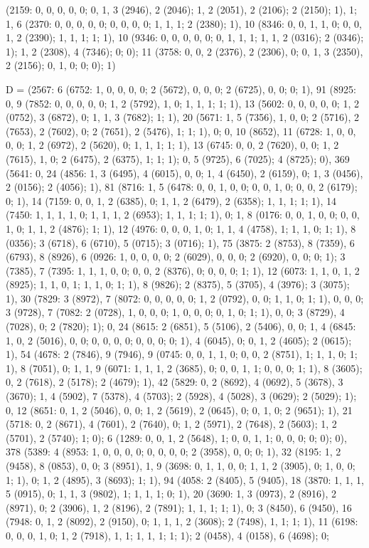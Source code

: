 {(2159: 0, 0, 0, 0, 0; 0, 1, 3 (2946), 2 (2046); 1, 2 (2051), 2 (2106); 2 (2150); 1), 1; 1, 6 (2370: 0, 0, 0, 0, 0; 0, 0, 0, 0; 1, 1, 1; 2 (2380); 1), 10 (8346: 0, 0, 1, 1, 0; 0, 0, 1, 2 (2390); 1, 1, 1; 1; 1), 10 (9346: 0, 0, 0, 0, 0; 0, 1, 1, 1; 1, 1, 2 (0316); 2 (0346); 1); 1, 2 (2308), 4 (7346); 0; 0); 11 (3758: 0, 0, 2 (2376), 2 (2306), 0; 0, 1, 3 (2350), 2 (2156); 0, 1, 0; 0; 0); 1)

D = (2567: 6 (6752: 1, 0, 0, 0, 0; 2 (5672), 0, 0, 0; 2 (6725), 0, 0; 0; 1), 91 (8925: 0, 9 (7852: 0, 0, 0, 0, 0; 1, 2 (5792), 1, 0; 1, 1, 1; 1; 1), 13 (5602: 0, 0, 0, 0, 0; 1, 2 (0752), 3 (6872), 0; 1, 1, 3 (7682); 1; 1), 20 (5671: 1, 5 (7356), 1, 0, 0; 2 (5716), 2 (7653), 2 (7602), 0; 2 (7651), 2 (5476), 1; 1; 1), 0; 0, 10 (8652), 11 (6728: 1, 0, 0, 0, 0; 1, 2 (6972), 2 (5620), 0; 1, 1, 1; 1; 1), 13 (6745: 0, 0, 2 (7620), 0, 0; 1, 2 (7615), 1, 0; 2 (6475), 2 (6375), 1; 1; 1); 0, 5 (9725), 6 (7025); 4 (8725); 0), 369 (5641: 0, 24 (4856: 1, 3 (6495), 4 (6015), 0, 0; 1, 4 (6450), 2 (6159), 0; 1, 3 (0456), 2 (0156); 2 (4056); 1), 81 (8716: 1, 5 (6478: 0, 0, 1, 0, 0; 0, 0, 1, 0; 0, 0, 2 (6179); 0; 1), 14 (7159: 0, 0, 1, 2 (6385), 0; 1, 1, 2 (6479), 2 (6358); 1, 1, 1; 1; 1), 14 (7450: 1, 1, 1, 1, 0; 1, 1, 1, 2 (6953); 1, 1, 1; 1; 1), 0; 1, 8 (0176: 0, 0, 1, 0, 0; 0, 0, 1, 0; 1, 1, 2 (4876); 1; 1), 12 (4976: 0, 0, 0, 1, 0; 1, 1, 4 (4758), 1; 1, 1, 0; 1; 1), 8 (0356); 3 (6718), 6 (6710), 5 (0715); 3 (0716); 1), 75 (3875: 2 (8753), 8 (7359), 6 (6793), 8 (8926), 6 (0926: 1, 0, 0, 0, 0; 2 (6029), 0, 0, 0; 2 (6920), 0, 0; 0; 1); 3 (7385), 7 (7395: 1, 1, 1, 0, 0; 0, 0, 2 (8376), 0; 0, 0, 0; 1; 1), 12 (6073: 1, 1, 0, 1, 2 (8925); 1, 1, 0, 1; 1, 1, 0; 1; 1), 8 (9826); 2 (8375), 5 (3705), 4 (3976); 3 (3075); 1), 30 (7829: 3 (8972), 7 (8072: 0, 0, 0, 0, 0; 1, 2 (0792), 0, 0; 1, 1, 0; 1; 1), 0, 0, 0; 3 (9728), 7 (7082: 2 (0728), 1, 0, 0, 0; 1, 0, 0, 0; 0, 1, 0; 1; 1), 0, 0; 3 (8729), 4 (7028), 0; 2 (7820); 1); 0, 24 (8615: 2 (6851), 5 (5106), 2 (5406), 0, 0; 1, 4 (6845: 1, 0, 2 (5016), 0, 0; 0, 0, 0, 0; 0, 0, 0; 0; 1), 4 (6045), 0; 0, 1, 2 (4605); 2 (0615); 1), 54 (4678: 2 (7846), 9 (7946), 9 (0745: 0, 0, 1, 1, 0; 0, 0, 2 (8751), 1; 1, 1, 0; 1; 1), 8 (7051), 0; 1, 1, 9 (6071: 1, 1, 1, 2 (3685), 0; 0, 0, 1, 1; 0, 0, 0; 1; 1), 8 (3605); 0, 2 (7618), 2 (5178); 2 (4679); 1), 42 (5829: 0, 2 (8692), 4 (0692), 5 (3678), 3 (3670); 1, 4 (5902), 7 (5378), 4 (5703); 2 (5928), 4 (5028), 3 (0629); 2 (5029); 1); 0, 12 (8651: 0, 1, 2 (5046), 0, 0; 1, 2 (5619), 2 (0645), 0; 0, 1, 0; 2 (9651); 1), 21 (5718: 0, 2 (8671), 4 (7601), 2 (7640), 0; 1, 2 (5971), 2 (7648), 2 (5603); 1, 2 (5701), 2 (5740); 1; 0); 6 (1289: 0, 0, 1, 2 (5648), 1; 0, 0, 1, 1; 0, 0, 0; 0; 0); 0), 378 (5389: 4 (8953: 1, 0, 0, 0, 0; 0, 0, 0, 0; 2 (3958), 0, 0; 0; 1), 32 (8195: 1, 2 (9458), 8 (0853), 0, 0; 3 (8951), 1, 9 (3698: 0, 1, 1, 0, 0; 1, 1, 2 (3905), 0; 1, 0, 0; 1; 1), 0; 1, 2 (4895), 3 (8693); 1; 1), 94 (4058: 2 (8405), 5 (9405), 18 (3870: 1, 1, 1, 5 (0915), 0; 1, 1, 3 (9802), 1; 1, 1, 1; 0; 1), 20 (3690: 1, 3 (0973), 2 (8916), 2 (8971), 0; 2 (3906), 1, 2 (8196), 2 (7891); 1, 1, 1; 1; 1), 0; 3 (8450), 6 (9450), 16 (7948: 0, 1, 2 (8092), 2 (9150), 0; 1, 1, 1, 2 (3608); 2 (7498), 1, 1; 1; 1), 11 (6198: 0, 0, 0, 1, 0; 1, 2 (7918), 1, 1; 1, 1, 1; 1; 1); 2 (0458), 4 (0158), 6 (4698); 0; }

